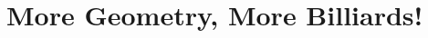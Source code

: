 \documentclass[compress,aspectratio=169,10pt,usenames,dvipsnames]{beamer}
\begin{document}
%
%
%
%
%
%


\section{More Geometry, More Billiards!}
\begin{frame}
  \sectionpage
\end{frame}

\end{document}
